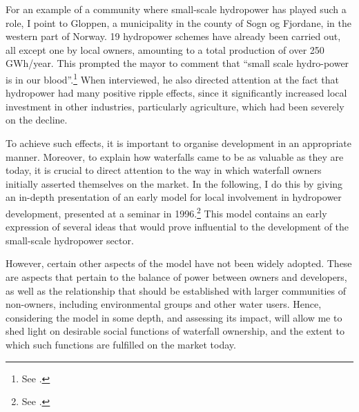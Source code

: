 For an example of a community where small-scale hydropower has played such a role, I point to Gloppen, a municipality in the county of Sogn og Fjordane, in the western part of Norway. 19 hydropower schemes have already been carried out, all except one by local owners, amounting to a total production of over 250 GWh/year. This prompted the mayor to comment that ``small scale hydro-power is in our blood''.\footnote{See \cite{starheim12}.} When interviewed, he also directed attention at the fact that hydropower had many positive ripple effects, since it significantly increased local investment in other industries, particularly agriculture, which had been severely on the decline.

To achieve such effects, it is important to organise development in an appropriate manner. Moreover, to explain how waterfalls came to be as valuable as they are today, it is crucial to direct attention to the way in which waterfall owners initially asserted themselves on the market. In the following, I do this by giving an in-depth presentation of an early model for local involvement in hydropower development, presented at a seminar in 1996.\footnote{See \cite{dyrkolbotn96}.} This model contains an early expression of several ideas that would prove influential to the development of the small-scale hydropower sector.

However, certain other aspects of the model have not been widely adopted. These are aspects that pertain to the balance of power between owners and developers, as well as the relationship that should be established with larger communities of non-owners, including environmental groups and other water users. Hence, considering the model in some depth, and assessing its impact, will allow me to shed light on desirable social functions of waterfall ownership, and the extent to which such functions are fulfilled on the market today.



